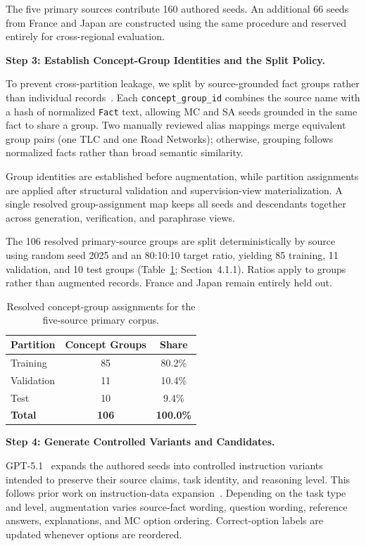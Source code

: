 \documentclass[a4paper,fleqn]{cas-sc}
\begin{document}
The five primary sources contribute 160 authored seeds. An additional 66 seeds from France and Japan are constructed using the same procedure and reserved entirely for cross-regional evaluation.

\medskip
\noindent\textbf{Step 3: Establish Concept-Group Identities and the Split Policy.}

To prevent cross-partition leakage, we split by source-grounded fact groups rather than individual records~\cite{kaufman2012leakage}. Each \texttt{concept\_group\_id} combines the source name with a hash of normalized \texttt{Fact} text, allowing MC and SA seeds grounded in the same fact to share a group. Two manually reviewed alias mappings merge equivalent group pairs (one TLC and one Road Networks); otherwise, grouping follows normalized facts rather than broad semantic similarity.

Group identities are established before augmentation, while partition assignments are applied after structural validation and supervision-view materialization. A single resolved group-assignment map keeps all seeds and descendants together across generation, verification, and paraphrase views.

The 106 resolved primary-source groups are split deterministically by source using random seed 2025 and an 80:10:10 target ratio, yielding 85 training, 11 validation, and 10 test groups (Table~\ref{tab:concept_split}; Section~4.1.1). Ratios apply to groups rather than augmented records. France and Japan remain entirely held out.

\begin{table}[H]
\centering
\small
\caption{Resolved concept-group assignments for the five-source primary corpus.}
\label{tab:concept_split}
\begin{tabular}{lcc}
\toprule
\textbf{Partition} & \textbf{Concept Groups} & \textbf{Share} \\
\midrule
Training   & 85 & 80.2\% \\
Validation & 11 & 10.4\% \\
Test       & 10 & 9.4\% \\
\midrule
\textbf{Total} & \textbf{106} & \textbf{100.0\%} \\
\bottomrule
\end{tabular}
\end{table}

\medskip
\noindent\textbf{Step 4: Generate Controlled Variants and Candidates.}

GPT\mbox{-}5.1~\cite{openai2025gpt5} expands the authored seeds into controlled instruction variants intended to preserve their source claims, task identity, and reasoning level. This follows prior work on instruction-data expansion~\cite{wang2023selfinstruct,taori2023alpaca}. Depending on the task type and level, augmentation varies source-fact wording, question wording, reference answers, explanations, and MC option ordering. Correct-option labels are updated whenever options are reordered.
\end{document}
